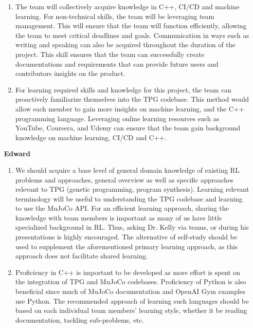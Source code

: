 \documentclass[12pt]{article}
\begin{document}
\begin{enumerate}

  \item The team will collectively acquire knowledge in C++, CI/CD and machine learning. For non-technical skills, the team will be leveraging team management. This will ensure that the team will function efficiently, allowing the team to meet critical deadlines and goals. Communication in ways such as writing and speaking can also be acquired throughout the duration of the project. This skill ensures that the team can successfully create documentations and requirements that can provide future users and contributors insights on the product.
  
  \item For learning required skills and knowledge for this project, the team can proactively familiarize themselves into the TPG codebase. This method would allow each member to gain more insights on machine learning, and the C++ programming language. Leveraging online learning resources such as YouTube, Coursera, and Udemy can ensure that the team gain background knowledge on machine learning, CI/CD and C++.
  
  \end{enumerate}


\textbf{Edward}

\begin{enumerate}

  \item We should acquire a base level of general domain knowledge of existing RL problems and approaches, general overview as well as specific approaches relevant to TPG (genetic programming, program synthesis). Learning relevant terminology will be useful to understanding the TPG codebase and learning to use the MuJoCo API. For an efficient learning approach, sharing the knowledge with team members is important as many of us have little specialized background in RL. Thus, asking Dr. Kelly via teams, or during his presentations is highly encouraged. The alternative of self-study should be used to supplement the aforementioned primary learning approach, as this approach does not facilitate shared learning.
  
  \item Proficiency in C++ is important to be developed as more effort is spent on the integration of TPG and MuJoCo codebases. Proficiency of Python is also beneficial since much of MuJoCo documentation and OpenAI Gym examples use Python. The recommended approach of learning such languages should be based on each individual team members’ learning style, whether it be reading documentation, tackling sub-problems, etc.
  
  \end{enumerate}
\end{document}
